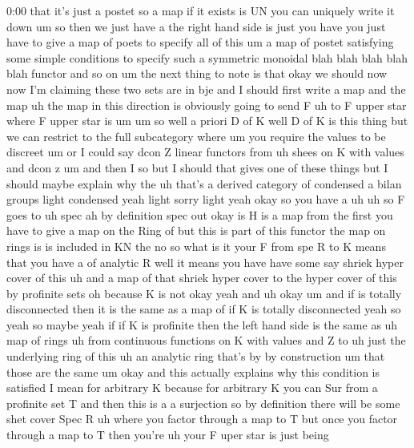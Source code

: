 \begin{unfinished}{0:00}
that  it's  just  a  postet  so  a  map  if  it
exists  is  UN  you  can  uniquely  write  it
down  um  so  then  we  just  have  a  the  right
hand  side  is  just  you  have  you  just  have
to  give  a  map  of  poets  to  specify  all  of
this  um  a  map  of  postet  satisfying  some
simple  conditions  to  specify  such  a
symmetric  monoidal  blah  blah  blah  blah
blah  functor  and  so  on
um  the  next  thing  to  note  is  that  okay
we  should  now  now  I'm  claiming  these  two
sets  are  in  bje  and  I  should  first  write
a  map  and  the  map  uh  the  map  in  this
direction  is  obviously  going  to  send  F
uh  to  F  upper  star  where  F  upper  star  is
um
um  so  well  a  priori  D  of  K  well  D  of  K
is  this  thing  but  we  can  restrict  to  the
full  subcategory  where  um  you  require
the  values  to  be
discreet  um  or  I  could  say  dcon  Z  linear
functors  from  uh  shees  on  K  with  values
and  dcon
z  um  and  then  I  so  but  I  should  that
gives  one  of  these  things  but  I  should
maybe  explain  why
the  uh  that's  a  derived  category  of
condensed  a  bilan
groups  light  condensed  yeah  light  sorry
light  yeah  okay  so  you  have  a
uh
uh  so  F  goes
to
uh  spec  ah  by  definition  spec  out  okay
is  H  is  a  map
from
the  first  you  have  to  give  a  map  on  the
Ring
of  but  this  is  part  of  this  functor  the
map  on  rings  is  is  included  in  KN
the  no  so  what  is  it
your  F  from  spe  R  to  K  means  that  you
have  a  of  analytic  R  well  it  means  you
have  have  some  say  shriek  hyper  cover  of
this  uh  and  a  map  of  that  shriek  hyper
cover  to  the  hyper  cover  of  this  by
profinite  sets  oh  because  K  is  not  okay
yeah  and
uh
okay
um  and  if  is  totally  disconnected  then
it  is  the  same  as  a  map
of  if  K  is  totally
disconnected  yeah  so  yeah  so  maybe  yeah
if  if  K  is
profinite  then  the  left  hand  side  is  the
same
as  uh  map  of
rings  uh  from  continuous  functions  on  K
with  values  and  Z  to  uh  just  the
underlying  ring  of  this  uh  an  analytic
ring  that's  by  by
construction  um  that  those  are  the
same
um  okay  and  this  actually  explains  why
this  condition  is  satisfied  I  mean  for
arbitrary  K  because  for  arbitrary  K  you
can  Sur  from  a  profinite  set  T  and  then
this  is  a  a  surjection  so  by  definition
there  will  be  some  shet  cover  Spec  R  uh
where  you  factor  through  a  map  to
T  but  once  you  factor  through  a  map  to  T
then
you're  uh  your  F  uper  star  is  just  being

\end{unfinished}
